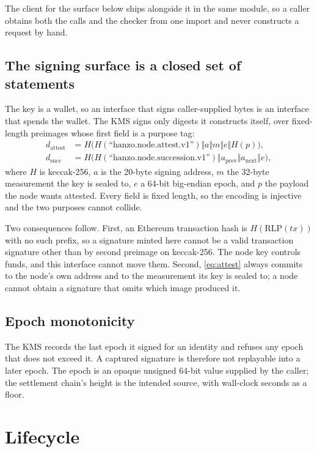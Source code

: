 \documentclass[11pt,a4paper]{article}
\begin{document}
The client for the surface below ships alongside it in the same module, so a
caller obtains both the calls and the checker from one import and never
constructs a request by hand.

\subsection{The signing surface is a closed set of statements}

The key is a wallet, so an interface that signs caller-supplied bytes is an
interface that spends the wallet. The KMS signs only digests it constructs
itself, over fixed-length preimages whose first field is a purpose tag:
\begin{align}
  d_{\mathrm{attest}} &= H\big(H(\text{``hanzo.node.attest.v1''}) \Vert a \Vert m \Vert e \Vert H(p)\big), \label{eq:attest}\\
  d_{\mathrm{succ}}   &= H\big(H(\text{``hanzo.node.succession.v1''}) \Vert a_{\mathrm{prev}} \Vert a_{\mathrm{next}} \Vert e\big), \label{eq:succ}
\end{align}
where $H$ is keccak-256, $a$ is the 20-byte signing address, $m$ the 32-byte
measurement the key is sealed to, $e$ a 64-bit big-endian epoch, and $p$ the
payload the node wants attested. Every field is fixed length, so the encoding is
injective and the two purposes cannot collide.

Two consequences follow. First, an Ethereum transaction hash is
$H(\mathrm{RLP}(\mathit{tx}))$ with no such prefix, so a signature minted here
cannot be a valid transaction signature other than by second preimage on
keccak-256. The node key controls funds, and this interface cannot move them.
Second, \eqref{eq:attest} always commits to the node's own address and to the
measurement its key is sealed to; a node cannot obtain a signature that omits
which image produced it.

\subsection{Epoch monotonicity}

The KMS records the last epoch it signed for an identity and refuses any epoch
that does not exceed it. A captured signature is therefore not replayable into a
later epoch. The epoch is an opaque unsigned 64-bit value supplied by the caller;
the settlement chain's height is the intended source, with wall-clock seconds as
a floor.

\section{Lifecycle}
\end{document}
